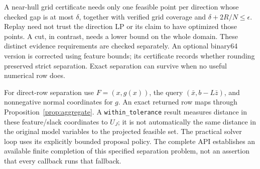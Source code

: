 A near-hull grid certificate needs only one feasible point per direction
whose checked gap is at most $\delta$, together with verified grid coverage
and $\delta+2R/N\le\epsilon$. Replay need not trust the direction LP or
its claim to have optimized those points. A cut, in contrast, needs a
lower bound on the whole domain. These distinct evidence requirements
are checked separately. An optional binary64 version is corrected using
feature bounds; its certificate records whether rounding preserved strict
separation. Exact separation can survive when no useful numerical row does.

For direct-row separation use $F=(x,g(x))$, the query
$(\bar x,b-L\bar z)$, and nonnegative normal coordinates for $g$.
An exact returned row maps through Proposition~\ref{prop:aggregate}.
A \texttt{within\_tolerance} result measures distance in these feature/slack
coordinates to $U_J$; it is not automatically the same distance in the
original model variables to the projected feasible set. The practical
solver loop uses its explicitly bounded proposal policy. The complete
API establishes an available finite completion of this specified
separation problem, not an assertion that every callback runs that fallback.

